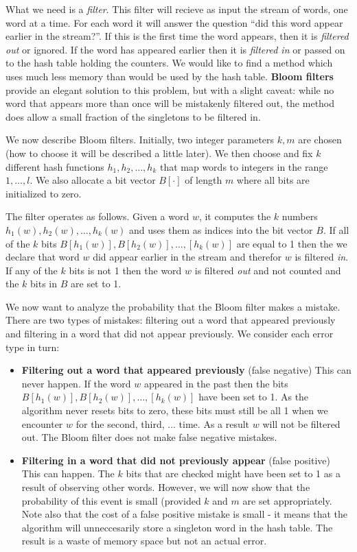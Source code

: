 What we need is a {\em filter}. This filter will recieve as input the
stream of words, one word at a time. For each word it will answer the
question ``did this word appear earlier in the stream?''. If this is
the first time the word appears, then it is {\em filtered out} or
ignored. If the word has appeared earlier then it is {\em filtered in}
or passed on to the hash table holding the counters. We would like to
find a method which uses much less memory than would be used by the
hash table.  {\bf Bloom filters} provide an elegant solution to this
problem, but with a slight caveat: while no word that appears more
than once will be mistakenly filtered out, the method does allow a
small fraction of the singletons to be filtered in.

We now describe Bloom filters. Initially, two integer parameters $k,m$
are chosen (how to choose it will be described a little later). We
then choose and fix $k$ different hash functions $h_1,h_2,\ldots,h_k$
that map words to integers in the range $1,\ldots,l$. We also allocate
a bit vector $B[\cdot]$ of length $m$ where all bits are initialized to
zero.

The filter operates as follows. Given a word $w$, it computes the $k$
numbers $h_1(w),h_2(w),\ldots,h_k(w)$ and uses them as indices into
the bit vector $B$. If all of the $k$ bits
$B[h_1(w)],B[h_2(w)],\ldots,[h_k(w)]$ are equal to 1 then the we
declare that word $w$ did appear earlier in the stream and therefor
$w$ is filtered {\em in}.  If any of the $k$ bits is not 1 then the
word $w$ is filtered {\em out} and not counted and the $k$ bits in $B$
are set to 1.

We now want to analyze the probability that the Bloom filter makes a
mistake. There are two types of mistakes: filtering out a word that
appeared previously and filtering in a word that did not appear
previously. We consider each error type in turn:
\begin{itemize}
\item {\bf Filtering out a word that appeared previously} (false
  negative) This can never happen. If the word $w$ appeared in the
  past then the bits $B[h_1(w)],B[h_2(w)],\ldots,[h_k(w)]$ have been
  set to 1. As the algorithm never resets bits to zero, these bits
  must still be all 1 when we encounter $w$ for the second, third,
  ... time. As a result $w$ will not be filtered out. The Bloom filter
  does not make false negative mistakes.
\item {\bf Filtering in a word that did not previously appear} (false
  positive) This can happen. The $k$ bits that are checked might have
  been set to 1 as a result of observing other words. However, we will
  now show that the probability of this event is small (provided $k$
  and $m$ are set appropriately. Note also that the cost of a false
  positive mistake is small - it means that the algorithm will
  unneccesarily store a singleton word in the hash table. The result
  is a waste of memory space but not an actual error.
\end{itemize}

